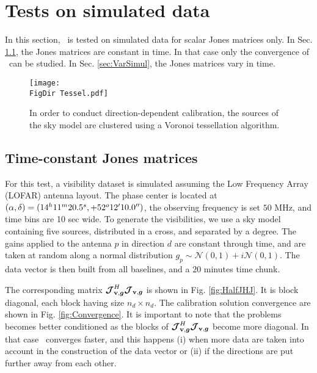 

\section{Tests on simulated data}

In this section, \COH~is tested on simulated data for scalar Jones
matrices only. In Sec. \ref{sec:SimpleSimul}, the
Jones matrices are constant in time. In that case only the convergence
of \COH~can be studied. In Sec. \ref{sec:VarSimul}, the Jones matrices vary in
time.

\begin{figure}
\begin{center}
\texttt{[image: \\FigDir Tessel.pdf]}
\caption{\label{fig:tessel} In order to conduct direction-dependent
  calibration, the sources of the sky model are clustered using a Voronoi
  tessellation algorithm.}
\end{center}
\end{figure}

\subsection{Time-constant Jones matrices}
\label{sec:SimpleSimul}

For this test, a visibility dataset is simulated assuming the Low Frequency Array (LOFAR) antenna
layout. The phase center is located at
$(\alpha,\delta)=(14^h11^m20.5^s, +52^{o}12\hbox{$^\prime$}10.0\hbox{$^{\prime\prime}$})$,
the observing frequency is set $50$ MHz, and time
bins are 10 sec wide. To generate the visibilities, we use a sky model containing five
sources, distributed in a cross, and separated by a degree. The gains
applied to the antenna $p$ in direction $d$ are
constant through time, and are taken at random along a normal distribution
$g_{p}\sim\mathcal{N}\left(0,1\right)+i\mathcal{N}\left(0,1\right)$. The
data vector is then built from all baselines, and a $20$ minutes time chunk.

The corresponding matrix $\bm{\mathcal{J}}_{\textbf{v},\bm{g}}^H\bm{\mathcal{J}}_{\textbf{v},\bm{g}}$ is shown in
Fig. \ref{fig:HalfJHJ}. It is block diagonal, each block having size
$n_d\times n_d$. The calibration solution convergence are shown
in Fig. \ref{fig:Convergence}. It is important to note that the
problems becomes better conditioned as the blocks of $\bm{\mathcal{J}}_{\textbf{v},\bm{g}}^H\bm{\mathcal{J}}_{\textbf{v},\bm{g}}$
become more diagonal. In that case \COH~converges faster, and this happens (i) when more data are taken into
account in the construction of the data vector or (ii) if the
directions are put further away from each other.

